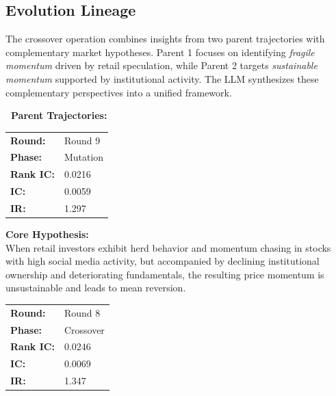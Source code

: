 \subsection{Evolution Lineage}

The crossover operation combines insights from two parent trajectories with complementary market hypotheses. Parent 1 focuses on identifying \textit{fragile momentum} driven by retail speculation, while Parent 2 targets \textit{sustainable momentum} supported by institutional activity. The LLM synthesizes these complementary perspectives into a unified framework.

\begin{tcolorbox}[
  colback=lightblue,
  colframe=darkblue,
  fonttitle=\bfseries,
  title={\faDna\ Evolution Information},
  arc=2mm,
  boxrule=0.5pt,
  breakable
]

\textbf{\faCodeBranch\ Parent Trajectories:}

\vspace{0.3cm}

\begin{tcolorbox}[colback=lightblue, colframe=darkblue!50, boxrule=0.3pt, title={\small\textbf{Parent 1: 1e6d57e38e89}}, fonttitle=\bfseries\small]
\small
\begin{tabular}{@{}ll@{}}
\textbf{Round:} & Round 9 \\
\textbf{Phase:} & Mutation \\
\textbf{Rank IC:} & 0.0216 \\
\textbf{IC:} & 0.0059 \\
\textbf{IR:} & 1.297 \\
\end{tabular}

\vspace{0.2cm}
\textbf{Core Hypothesis:}\\
\small
When retail investors exhibit herd behavior and momentum chasing in stocks with high social media activity, but accompanied by declining institutional ownership and deteriorating fundamentals, the resulting price momentum is unsustainable and leads to mean reversion.
\end{tcolorbox}

\vspace{0.2cm}

\begin{tcolorbox}[colback=lightblue, colframe=darkblue!50, boxrule=0.3pt, title={\small\textbf{Parent 2: 47e0f0e55382}}, fonttitle=\bfseries\small]
\small
\begin{tabular}{@{}ll@{}}
\textbf{Round:} & Round 8 \\
\textbf{Phase:} & Crossover \\
\textbf{Rank IC:} & 0.0246 \\
\textbf{IC:} & 0.0069 \\
\textbf{IR:} & 1.347 \\
\end{tabular}


\end{tcolorbox}
\end{tcolorbox}
